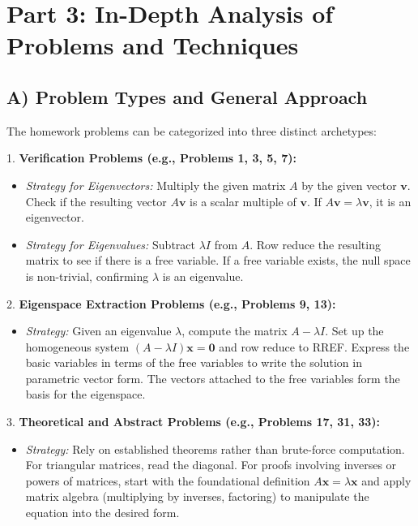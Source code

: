 \documentclass[11pt, a4paper]{article}
\theoremstyle{definition}
\theoremstyle{remark}
\begin{document}
\newpage
\section{Part 3: In-Depth Analysis of Problems and Techniques}

\subsection{A) Problem Types and General Approach}
The homework problems can be categorized into three distinct archetypes:

1. \textbf{Verification Problems (e.g., Problems 1, 3, 5, 7):}
   \begin{itemize}
       \item \textit{Strategy for Eigenvectors:} Multiply the given matrix $A$ by the given vector $\mathbf{v}$. Check if the resulting vector $A\mathbf{v}$ is a scalar multiple of $\mathbf{v}$. If $A\mathbf{v} = \lambda \mathbf{v}$, it is an eigenvector.
       \item \textit{Strategy for Eigenvalues:} Subtract $\lambda I$ from $A$. Row reduce the resulting matrix to see if there is a free variable. If a free variable exists, the null space is non-trivial, confirming $\lambda$ is an eigenvalue.
   \end{itemize}

2. \textbf{Eigenspace Extraction Problems (e.g., Problems 9, 13):}
   \begin{itemize}
       \item \textit{Strategy:} Given an eigenvalue $\lambda$, compute the matrix $A - \lambda I$. Set up the homogeneous system $(A - \lambda I)\mathbf{x} = \mathbf{0}$ and row reduce to RREF. Express the basic variables in terms of the free variables to write the solution in parametric vector form. The vectors attached to the free variables form the basis for the eigenspace.
   \end{itemize}

3. \textbf{Theoretical and Abstract Problems (e.g., Problems 17, 31, 33):}
   \begin{itemize}
       \item \textit{Strategy:} Rely on established theorems rather than brute-force computation. For triangular matrices, read the diagonal. For proofs involving inverses or powers of matrices, start with the foundational definition $A\mathbf{x} = \lambda \mathbf{x}$ and apply matrix algebra (multiplying by inverses, factoring) to manipulate the equation into the desired form.
   \end{itemize}
\end{document}
